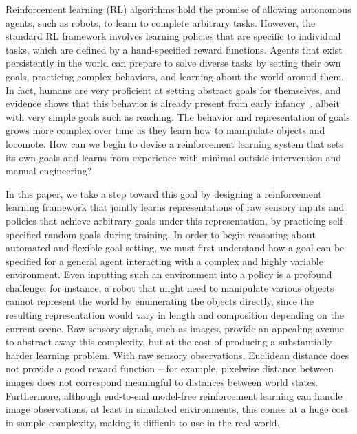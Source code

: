 

Reinforcement learning (RL) algorithms hold the promise of allowing autonomous agents, such as robots, to learn to complete arbitrary tasks. However, the standard RL framework involves learning policies that are specific to individual tasks, which are defined by a hand-specified reward functions. Agents that exist persistently in the world can prepare to solve diverse tasks by setting their own goals, practicing complex behaviors, and learning about the world around them. In fact, humans are very proficient at setting abstract goals for themselves, and evidence shows that this behavior is already present from early infancy~\cite{smith2005development}, albeit with very simple goals such as reaching. The behavior and representation of goals grows more complex over time as they learn how to manipulate objects and locomote. How can we begin to devise a reinforcement learning system that sets its own goals and learns from experience with minimal outside intervention and manual engineering?

In this paper, we take a step toward this goal by designing a reinforcement learning framework that jointly learns representations of raw sensory inputs and policies that achieve arbitrary goals under this representation, by practicing self-specified random goals during training. In order to begin reasoning about automated and flexible goal-setting, we must first understand how a goal can be specified for a general agent interacting with a complex and highly variable environment. Even inputting such an environment into a policy is a profound challenge: for instance, a robot that might need to manipulate various objects cannot represent the world by enumerating the objects directly, since the resulting representation would vary in length and composition depending on the current scene. Raw sensory signals, such as images, provide an appealing avenue to abstract away this complexity, but at the cost of producing a substantially harder learning problem. With raw sensory observations, Euclidean distance does not provide a good reward function -- for example, pixelwise distance between images does not correspond meaningful to distances between world states. Furthermore, although end-to-end model-free reinforcement learning can handle image observations, at least in simulated environments, this comes at a huge cost in sample complexity, making it difficult to use in the real world.

